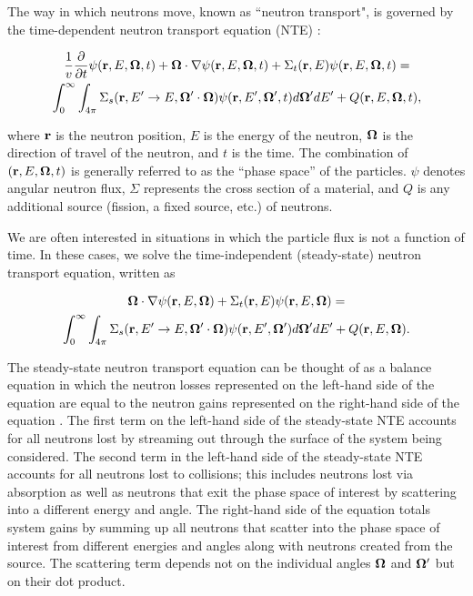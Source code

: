 The way in which neutrons move, known as ``neutron transport", is governed by the
time-dependent neutron transport equation (NTE) \cite{dude}:

\begin{multline}
\frac{1}{v}\frac{\partial}{\partial t}\psi(\textbf{r},E,\mathbf\Omega,t) +  \mathbf\Omega \cdot \nabla \psi(\textbf{r},E,\mathbf\Omega,t) + 
\Sigma_t(\textbf{r},E) \psi(\textbf{r},E,\mathbf\Omega,t) =  \\
\int_0^\infty\int_{4\pi} \Sigma_s(\textbf{r},E'\rightarrow E,\mathbf\Omega'\cdot\mathbf\Omega)
\psi(\textbf{r},E',\mathbf\Omega',t)d\mathbf\Omega'dE' + Q(\textbf{r},E,\mathbf\Omega,t),
\label{eq:tnte}
\end{multline}

\noindent where $\textbf{r}$ is the neutron position, $E$ is the energy of the neutron,
$\mathbf\Omega$ is the direction of travel of the neutron, and $t$ is the time. The combination of 
$(\textbf{r},E,\mathbf\Omega,t)$ is generally referred to as the ``phase space'' of the particles. $\psi$ 
denotes angular neutron flux, $\Sigma$ represents the cross section of a material, and $Q$ is
any additional source (fission, a fixed source, etc.) of neutrons.

We are often interested in situations in which the particle flux is not a function of time. In
these cases, we solve the time-independent (steady-state) neutron transport equation, written as

\begin{multline}
\mathbf\Omega \cdot \nabla \psi(\textbf{r},E,\mathbf\Omega) + \Sigma_t(\textbf{r},E) \psi(\textbf{r},E,\mathbf\Omega) =  \\
\int_0^\infty\int_{4\pi} \Sigma_s(\textbf{r},E'\rightarrow E,\mathbf\Omega'\cdot\mathbf\Omega)
\psi(\textbf{r},E',\mathbf\Omega')d\mathbf\Omega'dE' + Q(\textbf{r},E,\mathbf\Omega).
\label{eq:nte}
\end{multline}

The steady-state neutron transport equation can be thought of as a balance equation in 
which the neutron losses represented on the left-hand side of the equation are equal to
the neutron gains represented on the right-hand side of the equation \cite{dude}. The 
first term on the left-hand side of the steady-state NTE accounts for all neutrons lost by 
streaming out through the surface of the system being considered. The second term in 
the left-hand side of the steady-state NTE accounts for all neutrons 
lost to collisions; this includes neutrons lost via absorption as well as neutrons that
exit the phase space of interest by scattering into a different energy and angle. The 
right-hand side of the equation totals system gains by summing up all neutrons that 
scatter into the phase space of interest from different energies and angles along with 
neutrons created from the source. The scattering term depends not on the individual
angles $\mathbf\Omega$ and $\mathbf\Omega'$ but on their dot product.

